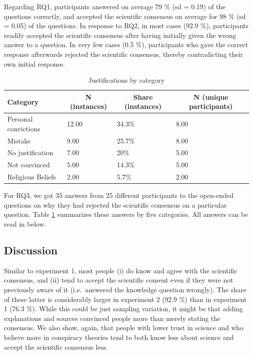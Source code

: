 \documentclass[
  doc,floatsintext]{apa6}
\begin{document}
Regarding RQ1, participants answered on average 79 \% (sd = 0.19) of the questions correctly, and accepted the scientific consensus on average for 98 \% (sd = 0.05) of the questions. In response to RQ2, in most cases (92.9 \%), participants readily accepted the scientific consensus after having initially given the wrong answer to a question. In very few cases (0.5 \%), participants who gave the correct response afterwards rejected the scientific consensus, thereby contradicting their own initial response.

\begin{table}[tbp]

\begin{center}
\begin{threeparttable}

\caption{\label{tab:exp2-justifications}Justifications by category}

\begin{tabular}{llll}
\toprule
Category & \multicolumn{1}{c}{N (instances)} & \multicolumn{1}{c}{Share (instances)} & \multicolumn{1}{c}{N (unique participants)}\\
\midrule
Personal convictions & 12.00 & 34.3\% & 8.00\\
Mistake & 9.00 & 25.7\% & 8.00\\
No justification & 7.00 & 20\% & 5.00\\
Not convinced & 5.00 & 14.3\% & 5.00\\
Religious Beliefs & 2.00 & 5.7\% & 2.00\\
\bottomrule
\end{tabular}

\end{threeparttable}
\end{center}

\end{table}

For RQ3, we got 35 answers from 25 different participants to the open-ended questions on why they had rejected the scientific consensus on a particular question. Table \ref{tab:exp2-justifications} summarizes these answers by five categories. All answers can be read in below.

\subsection{Discussion}\label{discussion-2}

Similar to experiment 1, most people (i) do know and agree with the scientific consensus, and (ii) tend to accept the scientific consent even if they were not previously aware of it (i.e.~answered the knowledge question wrongly). The share of these latter is considerably larger in experiment 2 (92.9 \%) than in experiment 1 (76.3 \%). While this could be just sampling variation, it might be that adding explanations and sources convinced people more than merely stating the consensus. We also show, again, that people with lower trust in science and who believe more in conspiracy theories tend to both know less about science and accept the scientific consensus less.
\end{document}
